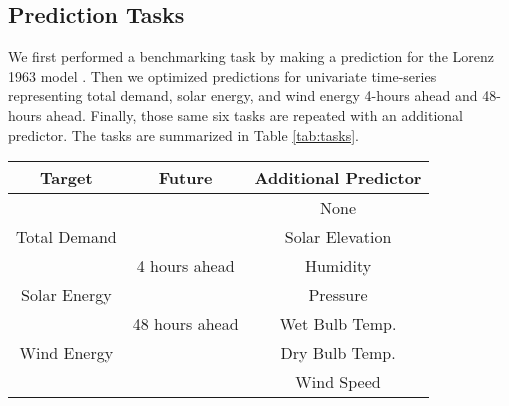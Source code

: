  \subsection{Prediction Tasks}

We first performed a benchmarking task by making a prediction for the Lorenz
1963 model \cite{lorenz_deterministic_1963}. Then we optimized predictions for univariate time-series
representing total demand, solar energy, and wind energy 4-hours ahead and 48-
hours ahead. Finally, those same six tasks are repeated with an additional predictor. The tasks are summarized in Table \ref{tab:tasks}.

\begin{table*}[ht]
  \centering
  \caption{Summary of Prediction Tasks}
  \label{tab:tasks}
  \begin{tabular}{c|c|c}
    \hline
    Target & Future & Additional Predictor\\
    \hline
    && None \\
    Total Demand && Solar Elevation\\
    &4 hours ahead& Humidity\\
    Solar Energy && Pressure\\
    &48 hours ahead& Wet Bulb Temp.\\
    Wind Energy && Dry Bulb Temp.\\
    && Wind Speed\\
  \end{tabular}\\[-1.4pt]%

\end{table*}
